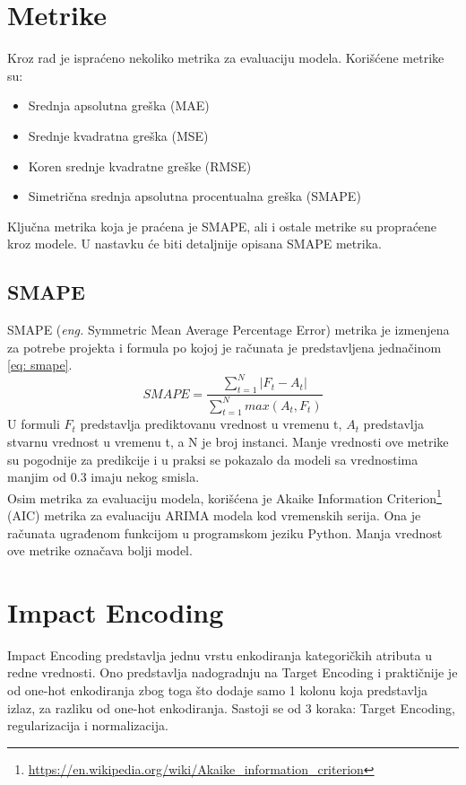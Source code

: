 \documentclass[12pt,oneside]{memoir}
\begin{document}
\section{Metrike}
Kroz rad je ispraćeno nekoliko metrika za evaluaciju modela. Korišćene metrike su:
\begin{itemize}
    \item Srednja apsolutna greška (MAE)
    \item Srednje kvadratna greška (MSE)
    \item Koren srednje kvadratne greške (RMSE)
    \item Simetrična srednja apsolutna procentualna greška (SMAPE)
\end{itemize}
Ključna metrika koja je praćena je SMAPE, ali i ostale metrike su propraćene kroz modele. U nastavku će biti detaljnije opisana SMAPE metrika.

\subsection{SMAPE}
SMAPE (\textit{eng.} Symmetric Mean Average Percentage Error) metrika je izmenjena za potrebe projekta i formula po kojoj je računata je predstavljena jednačinom \ref{eq: smape}.
\begin{equation}
\label{eq: smape}
SMAPE = \frac{\sum\limits_{t=1}^{N} |F_t - A_t|} {\sum\limits_{t=1}^{N}max(A_t, F_t)}
\end{equation}
U formuli $F_t$ predstavlja prediktovanu vrednost u vremenu t, $A_t$ predstavlja stvarnu vrednost u vremenu t, a N je broj instanci. Manje vrednosti ove metrike su pogodnije za predikcije i u praksi se pokazalo da modeli sa vrednostima manjim od 0.3 imaju nekog smisla.
\newline
\\
Osim metrika za evaluaciju modela, korišćena je Akaike Information Criterion\footnote{\url{https://en.wikipedia.org/wiki/Akaike_information_criterion}} (AIC) metrika za evaluaciju ARIMA modela kod vremenskih serija. Ona je računata ugrađenom funkcijom u programskom jeziku Python. Manja vrednost ove metrike označava bolji model.

\section{Impact Encoding}
\label{lbl: impact_encoding}
Impact Encoding predstavlja jednu vrstu enkodiranja kategoričkih atributa u redne vrednosti. Ono predstavlja nadogradnju na Target Encoding \cite{pargent2019benchmark} i praktičnije je od one-hot enkodiranja zbog toga što dodaje samo 1 kolonu koja predstavlja izlaz, za razliku od one-hot enkodiranja. Sastoji se od 3 koraka: Target Encoding, regularizacija i normalizacija.
\end{document}
